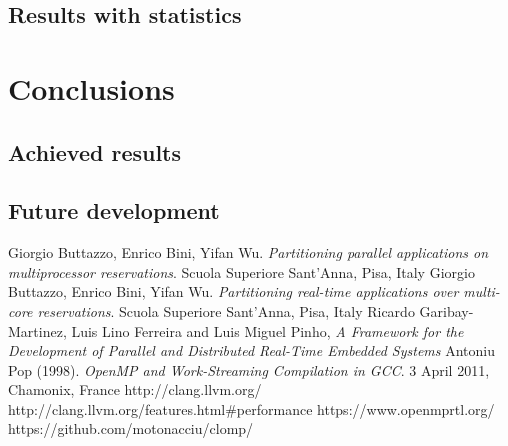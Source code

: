 \documentclass[a4paper,11pt,oneside]{book}
\begin{document}
\section{Results with statistics}

\chapter{Conclusions}
\section{Achieved results}
\section{Future development}

\begin{thebibliography}{9}
 Giorgio Buttazzo, Enrico Bini, Yifan Wu. \emph{Partitioning parallel applications on multiprocessor reservations}. Scuola Superiore Sant’Anna, Pisa, Italy
 Giorgio Buttazzo, Enrico Bini, Yifan Wu. \emph{Partitioning real-time applications over multi-core reservations}. Scuola Superiore Sant’Anna, Pisa, Italy
 Ricardo Garibay-Martinez, Luis Lino Ferreira and Luis Miguel Pinho, \emph{A Framework for the Development of Parallel and Distributed Real-Time Embedded Systems}
Antoniu Pop (1998). \emph{OpenMP and Work-Streaming Compilation in GCC}. 3 April 2011, Chamonix, France
http://clang.llvm.org/
http://clang.llvm.org/features.html\#performance
https://www.openmprtl.org/
https://github.com/motonacciu/clomp/


\end{thebibliography}
\end{document}
